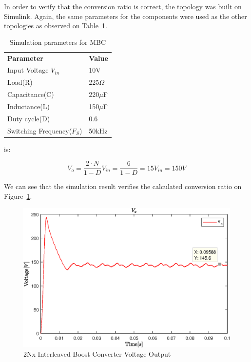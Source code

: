In order to verify that the conversion ratio is correct,
the topology was built on Simulink. 
Again, the same parameters for the components were used as the other topologies as observed on Table~\ref{tab:MBC_2Nx}.

\begin{table}[H]
\begin{center}
\caption {Simulation parameters for MBC} \label{tab:MBC_2Nx} 
\begin{tabular}{|l|l|}
\cline{1-2}
\textbf{Parameter} & \textbf{Value}  \\ \cline{1-2}
Input Voltage $V_{in}$          &      10V   \\ \cline{1-2}
Load(R)   & 225$\Omega$           \\ \cline{1-2}
Capacitance(C)          &       220$\mu$F     \\ \cline{1-2}
Inductance(L)          &      150$\mu$F      \\ \cline{1-2}
Duty cycle(D)          &     0.6       \\ \cline{1-2}
Switching Frequency($F_S$)          &      50kHz      \\ \cline{1-2}
\end{tabular}
\end{center}
\end{table}is:

\begin{equation}
	V_o = \frac{2\cdot N}{1-D}V_{in} = \frac{6}{1-D}  = 15V_{in}=150V
\end{equation}


We can see that the simulation result verifies the calculated conversion ratio on Figure~\ref{fig:MBC_2NxSimResult}.\\

\begin{figure}[H]
   \centering
   \includegraphics[width=\textwidth]{figures/yy2NxMultilevelBC/2Nx_SimResults.eps}
    \caption{2Nx Interleaved Boost Converter Voltage Output}
	\label{fig:MBC_2NxSimResult}
\end{figure}


